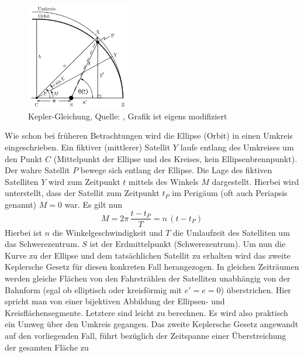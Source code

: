 \begin{figure}[h]                                                                           %
	\centering                                                                            	%
	\includegraphics[width=0.4\textwidth]{./images/keplers_equation.jpg}                    %
	\caption[Kepler-Gleichung]{Kepler-Gleichung, Quelle: \cite{Wiki:KeplerGl}, 
								Grafik ist eigens modifiziert}              				%
	\label{fig:kepler_gl}                                                                	%
\end{figure}                                                                              	%
Wie schon bei früheren Betrachtungen wird die Ellipse (Orbit) in einen Umkreis eingeschrieben. Ein fiktiver (mittlerer) Satellit \ensuremath{Y} laufe entlang des Umkreises um den Punkt \ensuremath{C} (Mittelpunkt der Ellipse und des Kreises, kein Ellipsenbrennpunkt). Der wahre Satellit \ensuremath{P} bewege sich entlang der Ellipse. Die Lage des fiktiven Satelliten \ensuremath{Y} wird zum Zeitpunkt \ensuremath{t} mittels des Winkels \ensuremath{M} dargestellt. Hierbei wird unterstellt, dass der Satellit zum Zeitpunkt \ensuremath{t_P} im Perigäum (oft auch Periapsis genannt) \ensuremath{M=0} war. Es gilt nun
\begin{equation}
	M=2\pi\,\frac{t-t_P}{T}=n\,(t-t_P)
\end{equation}   
Hierbei ist \ensuremath{n} die Winkelgeschwindigkeit und \ensuremath{T} die Umlaufzeit des Satelliten um das Schwerezentrum. \ensuremath{S} ist der Erdmittelpunkt (Schwerezentrum). 
Um nun die Kurve zu der Ellipse und dem tatsächlichen Satellit zu erhalten wird das zweite Keplersche Gesetz für diesen konkreten Fall herangezogen. In gleichen Zeiträumen werden gleiche Flächen von den Fahrstrählen der Satelliten unabhängig von der Bahnform (egal ob elliptisch oder kreisförmig mit \ensuremath{e'=e=0}) überstrichen. Hier spricht man von einer bijektiven Abbildung der Ellipsen- und Kreisflächensegmente. Letztere sind leicht zu berechnen. Es wird also praktisch ein Umweg über den Umkreis gegangen. Das zweite Keplersche Gesetz angewandt auf den vorliegenden Fall, führt bezüglich der Zeitspanne einer Überstreichung der gesamten Fläche zu
